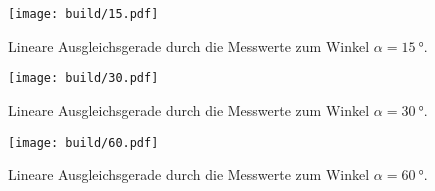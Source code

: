 \begin{figure}[H]
  \centering
  \texttt{[image: build/15.pdf]}
  \caption{Lineare Ausgleichsgerade durch die Messwerte zum Winkel $\alpha = \SI{15}{\degree}$.}
  \label{fig:15}
\end{figure}

\begin{figure}[H]
  \centering
  \texttt{[image: build/30.pdf]}
  \caption{Lineare Ausgleichsgerade durch die Messwerte zum Winkel $\alpha = \SI{30}{\degree}$.}
  \label{fig:30}
\end{figure}

\begin{figure}[H]
  \centering
  \texttt{[image: build/60.pdf]}
  \caption{Lineare Ausgleichsgerade durch die Messwerte zum Winkel $\alpha = \SI{60}{\degree}$.}
  \label{fig:60}
\end{figure}




